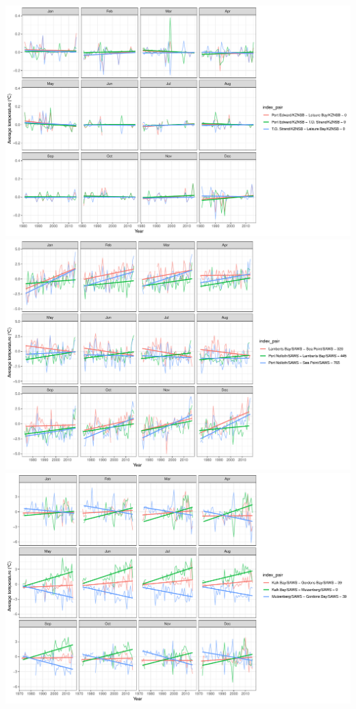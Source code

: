 \documentclass[12pt,]{article}
\begin{document}
\includegraphics{figures/SACTN_clust_4_plot2.pdf}
\includegraphics{figures/SACTN_clust_5_plot2.pdf}
\includegraphics{figures/SACTN_clust_6_plot2.pdf}
\end{document}
